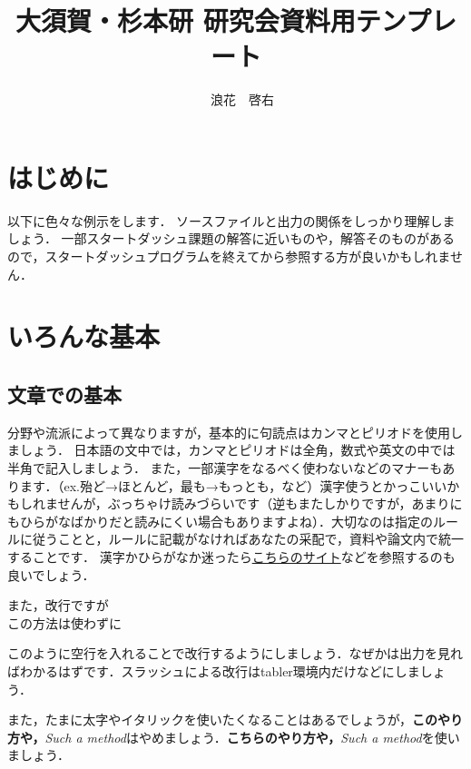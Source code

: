 \documentclass[a4j]{jsarticle}
\title{大須賀・杉本研 研究会資料用テンプレート}
\author{
    　浪花　啓右
     }
\numberwithin{equation}{section}%
\begin{document}
\maketitle
\thispagestyle{empty}
%
\section{はじめに}
以下に色々な例示をします．
ソースファイルと出力の関係をしっかり理解しましょう．
一部スタートダッシュ課題の解答に近いものや，解答そのものがあるので，スタートダッシュプログラムを終えてから参照する方が良いかもしれません．

\section{いろんな基本}

\subsection{文章での基本}
分野や流派によって異なりますが，基本的に句読点はカンマとピリオドを使用しましょう．
日本語の文中では，カンマとピリオドは全角，数式や英文の中では半角で記入しましょう．
また，一部漢字をなるべく使わないなどのマナーもあります．（ex.殆ど→ほとんど，最も→もっとも，など）漢字使うとかっこいいかもしれませんが，ぶっちゃけ読みづらいです（逆もまたしかりですが，あまりにもひらがなばかりだと読みにくい場合もありますよね）．大切なのは指定のルールに従うことと，ルールに記載がなければあなたの采配で，資料や論文内で統一することです．
漢字かひらがなか迷ったら\href{http://www.yamanouchi-yri.com/yrihp/techwrt-2-4s/t-2-4s03a.htm}{こちらのサイト}などを参照するのも良いでしょう．


また，改行ですが\\
この方法は使わずに

このように空行を入れることで改行するようにしましょう．なぜかは出力を見ればわかるはずです．スラッシュによる改行はtabler環境内だけなどにしましょう．

また，たまに太字やイタリックを使いたくなることはあるでしょうが，{\bf このやり方や，}{\it Such a method}はやめましょう．\textbf{こちらのやり方や，}\textit{Such a method}を使いましょう．
\end{document}
